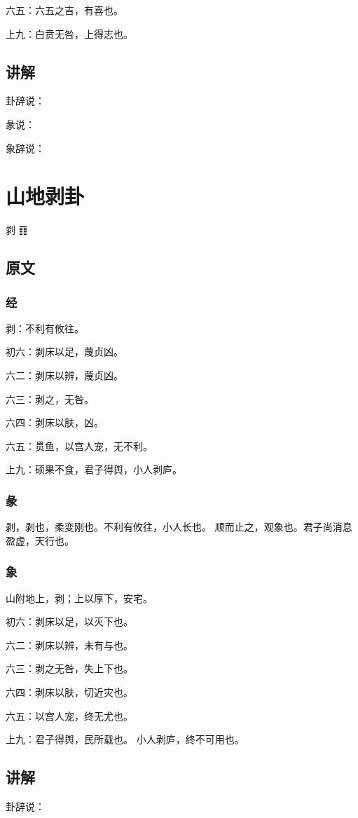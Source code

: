 \documentclass[12pt,oneside]{book}
\begin{document}
六五：六五之吉，有喜也。

上九：白贲无咎，上得志也。

\section{讲解}
卦辞说：

彖说：

象辞说：


\chapter{山地剥卦}
剥 {\Large ䷖}

\section{原文}
\subsection{经}
剥：不利有攸往。

初六：剥床以足，蔑贞凶。

六二：剥床以辨，蔑贞凶。

六三：剥之，无咎。

六四：剥床以肤，凶。

六五：贯鱼，以宫人宠，无不利。

上九：硕果不食，君子得舆，小人剥庐。

\subsection{彖}
剥，剥也，柔变刚也。不利有攸往，小人长也。 顺而止之，观象也。君子尚消息盈虚，天行也。
\subsection{象}
山附地上，剥；上以厚下，安宅。

初六：剥床以足，以灭下也。

六二：剥床以辨，未有与也。

六三：剥之无咎，失上下也。

六四：剥床以肤，切近灾也。

六五：以宫人宠，终无尤也。

上九：君子得舆，民所载也。 小人剥庐，终不可用也。

\section{讲解}
卦辞说：
\end{document}
